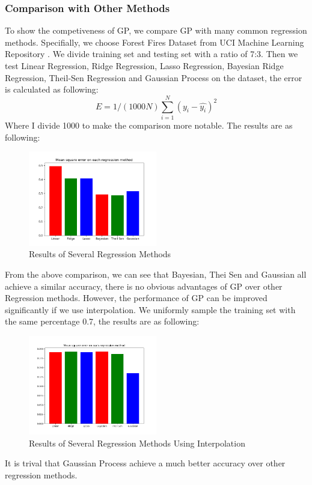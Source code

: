 \documentclass{article}
\begin{document}
\subsubsection{Comparison with Other Methods}
 To show the competiveness of GP, we compare GP with many common regression methods. Specifially, we choose Forest Fires Dataset from UCI Machine Learning Repository \cite{9}. We divide training set and testing set with a ratio of 7:3. Then we test Linear Regression, Ridge Regression, Lasso Regression, Bayesian Ridge Regression, Theil-Sen Regression and Gaussian Process on the dataset, the error is calculated as following:
 \begin{equation}
 E=1/(1000N)\sum_{i=1}^{N}(y_i-\hat{y_i})^2
 \end{equation}
 Where I divide 1000 to make the comparison more notable. The results are as following:
  \begin{figure}[H]
 	\begin{center}
 		\includegraphics[width=0.5\textwidth]{non_interpolation_comparison}
 	\end{center}
 	\caption{Results of Several Regression Methods }
 	\label{fig3}
 \end{figure}
 From the above comparison, we can see that Bayesian, Thei Sen and Gaussian all achieve a similar accuracy, there is no obvious advantages of GP over other Regression methods. However, the performance of GP can be improved significantly if we use interpolation. We uniformly sample the training set with the same percentage 0.7, the results are as following:
   \begin{figure}[H]
 	\begin{center}
 		\includegraphics[width=0.5\textwidth]{Interpolation_comparison}
 	\end{center}
 	\caption{Results of Several Regression Methods Using Interpolation}
 	\label{fig4}
 \end{figure}
It is trival that Gaussian Process achieve a much better accuracy over other regression methods.
\end{document}
